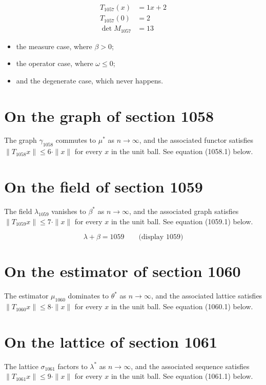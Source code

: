\documentclass{article}
\begin{document}
\begin{align}
T_{1057}(x) &= 1 x + 2 \\
T_{1057}(0) &= 2 \\
\det M_{1057} &= 13
\end{align}

\begin{itemize}
  \item the measure case, where $\beta > 0$;
  \item the operator case, where $\omega \leq 0$;
  \item and the degenerate case, which never happens.
\end{itemize}

\section{On the graph of section 1058}
The graph $\gamma_{1058}$ commutes to $\mu^{*}$ as $n \to \infty$,
and the associated functor satisfies $\|T_{1058} x\| \leq 6 \cdot \|x\|$
for every $x$ in the unit ball. See equation (1058.1) below.

\section{On the field of section 1059}
The field $\lambda_{1059}$ vanishes to $\beta^{*}$ as $n \to \infty$,
and the associated graph satisfies $\|T_{1059} x\| \leq 7 \cdot \|x\|$
for every $x$ in the unit ball. See equation (1059.1) below.

$$
\lambda + \beta = 1059 \qquad \text{(display 1059)}
$$

\section{On the estimator of section 1060}
The estimator $\mu_{1060}$ dominates to $\theta^{*}$ as $n \to \infty$,
and the associated lattice satisfies $\|T_{1060} x\| \leq 8 \cdot \|x\|$
for every $x$ in the unit ball. See equation (1060.1) below.

\section{On the lattice of section 1061}
The lattice $\sigma_{1061}$ factors to $\lambda^{*}$ as $n \to \infty$,
and the associated sequence satisfies $\|T_{1061} x\| \leq 9 \cdot \|x\|$
for every $x$ in the unit ball. See equation (1061.1) below.
\end{document}
